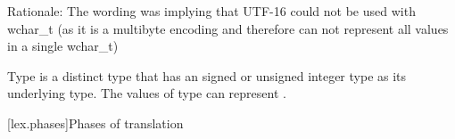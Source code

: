 \documentclass{wg21}
\begin{document}
\begin{quoteblock}
Rationale: The wording was implying that UTF-16 could not be used with wchar_t (as it is a multibyte encoding and therefore can not represent all values in a single wchar_t)
\end{quoteblock}


%
%
%
Type  is a distinct type that has
an 
signed or unsigned integer type as its underlying type.
The values of type  can represent
.


[lex.phases]{Phases of translation}%
\end{document}
